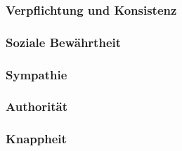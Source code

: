 \subsubsection{Verpflichtung und Konsistenz}
\subsubsection{Soziale Bewährtheit}
\subsubsection{Sympathie}
\subsubsection{Authorität}
\subsubsection{Knappheit}

